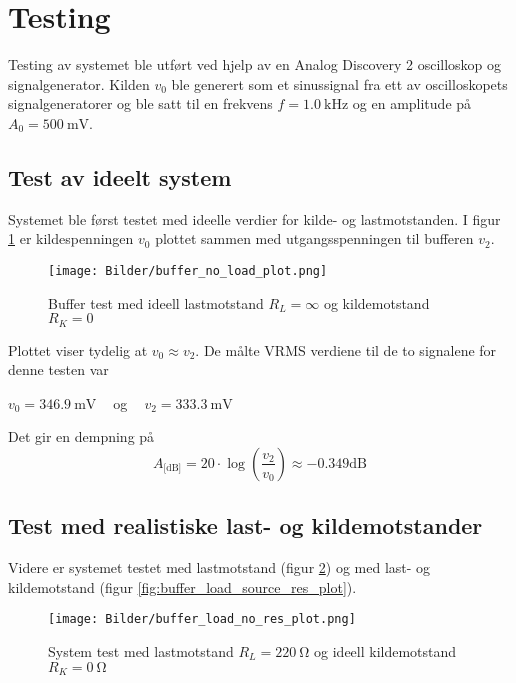 \section{Testing}

Testing av systemet ble utført ved hjelp av en Analog Discovery 2 \cite{analog_discovery} oscilloskop og 
signalgenerator. Kilden $v_0$ ble generert som et sinussignal fra ett av oscilloskopets signalgeneratorer 
og ble satt til en frekvens $f = \SI{1.0}{\kilo\hertz}$ og en amplitude på $A_0 = \SI{500}{\milli\volt}$.

\subsection{Test av ideelt system}
Systemet ble først testet med ideelle verdier for kilde- og lastmotstanden. I figur \ref{fig:buffer_no_load_plot}
er kildespenningen $v_0$ plottet sammen med utgangsspenningen til bufferen $v_2$.
\begin{figure}[H]
    \centering 
    \texttt{[image: Bilder/buffer\_no\_load\_plot.png]}
    \caption{Buffer test med ideell lastmotstand $R_L = \infty$ og kildemotstand $R_K = 0$}
    \label{fig:buffer_no_load_plot}
\end{figure}
Plottet viser tydelig at $v_0 \approx v_2$. De målte VRMS verdiene til de to signalene for denne testen var 
\begin{center}
    $v_0 = \SI{346.9}{\milli\volt}\:\:\:\:$ og $\:\:\:\:v_2 = \SI{333.3}{\milli\volt}$ 
\end{center}

Det gir en dempning på
\[
    A_\text{[dB]} = 20 \cdot \log{\left(\frac{v_2}{v_0}\right)} \approx -0.349 \text{dB}
\]

\subsection{Test med realistiske last- og kildemotstander}
Videre er systemet testet med lastmotstand (figur \ref{fig:buffer_load_no_res_plot}) og med last- 
og kildemotstand (figur \ref{fig:buffer_load_source_res_plot}).

\begin{figure}[H]
    \centering 
    \texttt{[image: Bilder/buffer\_load\_no\_res\_plot.png]}
    \caption{System test med lastmotstand $R_L = \SI{220}{\ohm}$ og ideell kildemotstand $R_K = \SI{0}{\ohm}$}
    \label{fig:buffer_load_no_res_plot}
\end{figure}

